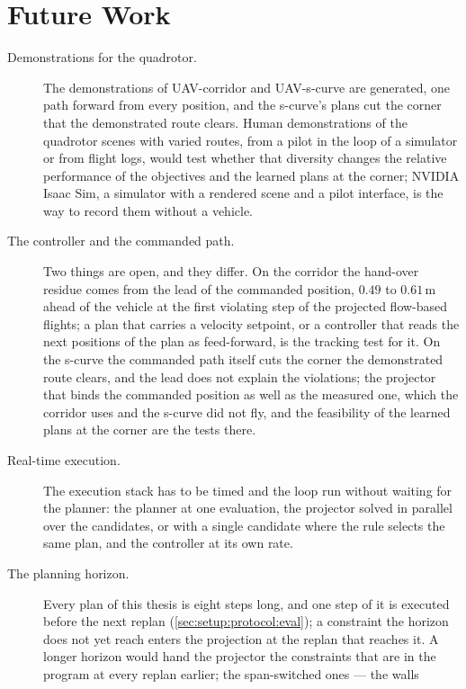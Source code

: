\section{Future Work}\label{sec:disc:future}

\begin{description}
  \item[Demonstrations for the quadrotor.] The demonstrations of UAV-corridor and UAV-s-curve are
    generated, one path forward from every position, and the s-curve's plans cut the corner that the
    demonstrated route clears. Human demonstrations of the quadrotor scenes with varied routes, from a
    pilot in the loop of a simulator or from flight logs, would test whether that diversity changes
    the relative performance of the objectives and the learned plans at the corner; NVIDIA Isaac Sim,
    a simulator with a rendered scene and a pilot interface, is the way to record them without a
    vehicle.
  \item[The controller and the commanded path.] Two things are open, and they differ. On the corridor
    the hand-over residue comes from the lead of the commanded position, $0.49$ to $0.61$\,m ahead of
    the vehicle at the first violating step of the projected flow-based flights; a plan that carries a
    velocity setpoint, or a controller that reads the next positions of the plan as feed-forward, is
    the tracking test for it. On the s-curve the commanded path itself cuts the corner the
    demonstrated route clears, and the lead does not explain the violations; the projector that binds
    the commanded position as well as the measured one, which the corridor uses and the s-curve did
    not fly, and the feasibility of the learned plans at the corner are the tests there.
  \item[Real-time execution.] The execution stack has to be timed and the loop run without waiting for
    the planner: the planner at one evaluation, the projector solved in parallel over the candidates,
    or with a single candidate where the rule selects the same plan, and the controller at its own rate.
  \item[The planning horizon.] Every plan of this thesis is eight steps long, and one step of it is
    executed before the next replan (\autoref{sec:setup:protocol:eval}); a constraint the horizon does
    not yet reach enters the projection at the replan that reaches it. A longer horizon would hand the
    projector the constraints that are in the program at every replan earlier; the span-switched ones --- the walls

\end{description}
